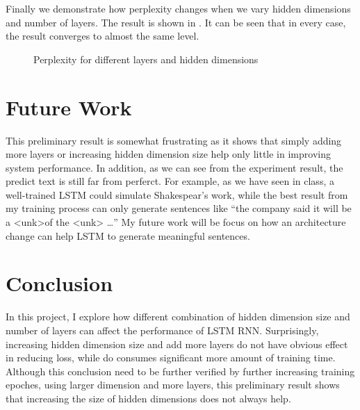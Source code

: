 \documentclass{article}
\begin{document}
Finally we demonstrate how perplexity changes when we vary hidden dimensions and
number of layers. The result is shown in . It can be seen that
in every case, the result converges to almost the same level. 
\begin{figure}
\centering
{}
\caption{Perplexity for different layers and hidden dimensions}
\label{fig:perp}
\end{figure}
\section{Future Work}
This preliminary result is somewhat frustrating as it shows that simply adding
more layers or increasing hidden dimension size help only little in improving
system performance. In addition, as we can see from the experiment result,
the predict text is still far from perferct. For example, as we have seen in
class, a well-trained LSTM could simulate Shakespear's work, while the best
result from my training process can only generate sentences like ``the company
said it will be a \textless unk\textgreater of the \textless unk\textgreater
\ldots'' My future work will be focus on how an architecture change can help
LSTM to generate meaningful sentences.
\section{Conclusion}
In this project, I explore how different combination of hidden dimension size
and number of layers can affect the performance of LSTM RNN. Surprisingly,
increasing hidden dimension size and add more layers do not have obvious effect
in reducing loss, while do consumes significant more amount of training time.
Although this conclusion need to be further verified by further increasing
training epoches, using larger dimension and more layers, this preliminary
result shows that increasing the size of hidden dimensions does not always help.
\end{document}
